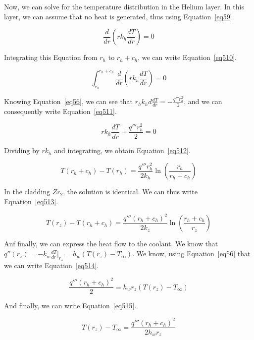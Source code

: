 Now, we can solve for the temperature distribution in the Helium layer. In this layer, we can assume that no heat is generated, thus using Equation~\ref{eq59}.


\begin{equation}\label{eq59}
\frac{d}{dr}\left( rk_h\frac{dT}{dr}\right) = 0
\end{equation}

Integrating this Equation from $r_h$ to $r_h + c_h$, we can write Equation~\ref{eq510}.


\begin{equation}\label{eq510}
\int_{r_h}^{r_h+c_h}\frac{d}{dr}\left( rk_h\frac{dT}{dr}\right) = 0
\end{equation}

Knowing Equation~\ref{eq56}, we can see that $r_hk_hd\frac{dT}{dr} = -\frac{q'''r_h^2}{2}$, and we can consequently write Equation~\ref{eq511}.

\begin{equation}\label{eq511}
rk_h\frac{dT}{dr} + \frac{q'''r_h^2}{2} = 0
\end{equation}

Dividing by $rk_h$ and integrating, we obtain Equation~\ref{eq512}.



\begin{equation}\label{eq512}
T(r_h+c_h)-T(r_h) = \frac{q'''r_h^2}{2k_h} \ln \left( \frac{r_h}{r_h+c_h} \right)
\end{equation}


In the cladding $Zr_2$, the solution is identical. We can thus write Equation~\ref{eq513}.

\begin{equation}\label{eq513}
T(r_z)-T(r_h+c_h) = \frac{q'''(r_h+c_h)^2}{2k_z} \ln \left( \frac{r_h+c_h}{r_z} \right)
\end{equation}

Anf finally, we can express the heat flow to the coolant. We know that $q''(r_z)=-k_w\frac{dT}{dr}\bigg\rvert_{r_z} = h_w(T(r_z)-T_{\infty})$. We know, using Equation~\ref{eq56} that we can write Equation~\ref{eq514}.

\begin{equation}\label{eq514}
\frac{q'''(r_h+c_h)^2}{2} = h_wr_z(T(r_z)-T_{\infty})
\end{equation}

And finally, we can write Equation~\ref{eq515}.


\begin{equation}\label{eq515}
T(r_z)-T_{\infty} = \frac{q'''(r_h+c_h)^2}{2h_wr_z}
\end{equation}

